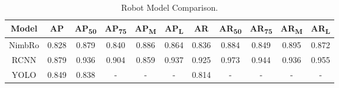 \begin{longtable}{|c|c|c|c|c|c|c|c|c|c|c|}
  \caption{Robot Model Comparison.}
  \label{tb:robotmodelcomparison}\\
  \hline
  \rowcolor[HTML]{C0C0C0}
  \textbf{Model} & \textbf{AP} & \textbf{AP\textsubscript{50}} & \textbf{AP\textsubscript{75}} & \textbf{AP\textsubscript{M}} & \textbf{AP\textsubscript{L}} & \textbf{AR} & \textbf{AR\textsubscript{50}} & \textbf{AR\textsubscript{75}} & \textbf{AR\textsubscript{M}} & \textbf{AR\textsubscript{L}} \\
  \hline
  NimbRo         & 0.828       & 0.879                         & 0.840                         & 0.886                        & 0.864                        & 0.836       & 0.884                         & 0.849                         & 0.895                        & 0.872 \\
  \hline                        
  RCNN           & 0.879       & 0.936                         & 0.904                         & 0.859                        & 0.937                        & 0.925       & 0.973                         & 0.944                         & 0.936                        & 0.955 \\
  \hline                        
  YOLO           & 0.849       & 0.838                         & -                             & -                            & -                            & 0.814       & -                             & -                             & -                            & - \\
  \hline
\end{longtable}

